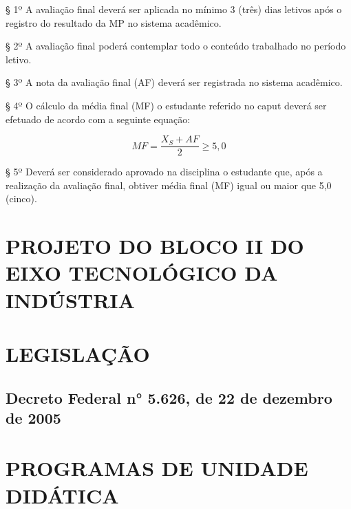 \documentclass{paper}
\begin{document}
§ 1º A avaliação final deverá ser aplicada no mínimo 3 (três) dias letivos após o registro do resultado da MP no sistema acadêmico.

§ 2º A avaliação final poderá contemplar todo o conteúdo trabalhado no período letivo.

§ 3º A nota da avaliação final (AF) deverá ser registrada no sistema acadêmico.

§ 4º O cálculo da média final (MF) o estudante referido no caput deverá ser efetuado de acordo com a seguinte equação:

\begin{equation*}
MF=\frac{X_S+AF}{2}\geq 5,0
\end{equation*}
\vspace{0,3cm}

§ 5º Deverá ser considerado aprovado na disciplina o estudante que, após a realização da avaliação final, obtiver média final (MF) igual ou maior que 5,0 (cinco).

%

\clearpage\section{PROJETO DO BLOCO II DO EIXO TECNOLÓGICO DA INDÚSTRIA}
\label{anexoProjeto}


\clearpage\section{LEGISLAÇÃO}
\label{anexoLegislacao}

\subsection{Decreto Federal n° 5.626, de 22 de dezembro de 2005}
\label{anexoDecreto}



\clearpage\section{PROGRAMAS DE UNIDADE DIDÁTICA}
\label{anexoPUD}


\newpage
\if{}
    
\else
    
\fi
\newpage
\end{document}
